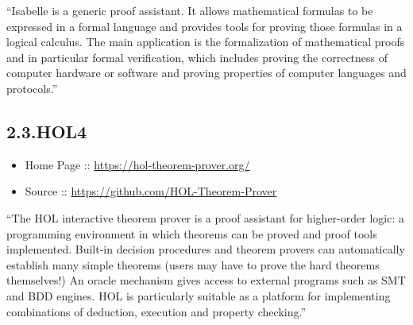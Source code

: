 \documentclass[12pt,twoside]{article}
\begin{document}
\noindent{}\textquotedblleft{}Isabelle is a generic proof assistant. It allows mathematical
formulas to be expressed in a formal language and provides tools for
proving those formulas in a logical calculus. The main application is
the formalization of mathematical proofs and in particular formal
verification, which includes proving the correctness of computer
hardware or software and proving properties of computer languages and
protocols.\textquotedblright{}%

\subsection{2.3.\hspace*{0.5em}HOL4}\label{sec-hol4}%

\begin{itemize}[noitemsep,topsep=\mdcompacttopsep]%

\item{}Home Page :: \href{https://hol-theorem-prover.org/}{{\ttfamily https://\hspace{0pt}hol-\hspace{0pt}theorem-\hspace{0pt}prover.\hspace{0pt}org/\hspace{0pt}}}%

\item{}Source :: \href{https://github.com/HOL-Theorem-Prover}{{\ttfamily https://\hspace{0pt}github.\hspace{0pt}com/\hspace{0pt}HOL-\hspace{0pt}Theorem-\hspace{0pt}Prover}}%
\end{itemize}%

\noindent{}\textquotedblleft{}The HOL interactive theorem prover is a proof assistant for
higher-order logic: a programming environment in which theorems can be
proved and proof tools implemented. Built-in decision procedures and
theorem provers can automatically establish many simple theorems
(users may have to prove the hard theorems themselves!) An oracle
mechanism gives access to external programs such as SMT and BDD
engines. HOL is particularly suitable as a platform for implementing
combinations of deduction, execution and property checking.\textquotedblright{}%
\end{document}
